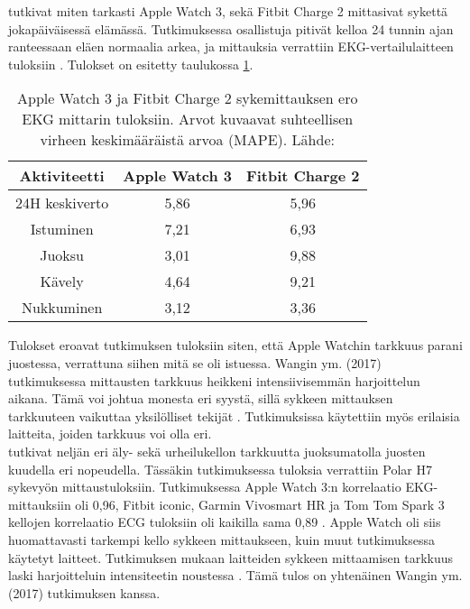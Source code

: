 \documentclass[utf8,bachelor,finnish]{bachelor}
\begin{document}
  \textcite{nelson_accuracy_2019} tutkivat miten tarkasti Apple Watch 3, sekä Fitbit Charge 2 mittasivat sykettä jokapäiväisessä elämässä.
   Tutkimuksessa osallistuja pitivät kelloa 24 tunnin ajan ranteessaan eläen normaalia arkea, ja mittauksia verrattiin
    EKG-vertailulaitteen tuloksiin \parencite{nelson_accuracy_2019}. Tulokset on esitetty taulukossa \ref{table:nelson}.\\
    
    \begin{table}[H]
     \begin{center}
      \begin{tabular}{||c c c||}   
       \hline
       Aktiviteetti & Apple Watch 3 & Fitbit Charge 2\\ [0.5ex] 
       \hline\hline
       24H keskiverto & 5,86 & 5,96\\ 
       \hline
       Istuminen & 7,21 & 6,93\\ 
       \hline
       Juoksu & 3,01 & 9,88 \\
       \hline
       Kävely & 4,64 & 9,21\\
       \hline
       Nukkuminen & 3,12 & 3,36\\[1ex] 
       \hline
      \end{tabular}
    \caption{Apple Watch 3 ja Fitbit Charge 2 sykemittauksen ero EKG mittarin tuloksiin. Arvot kuvaavat suhteellisen virheen keskimääräistä arvoa (MAPE). Lähde: \textcite{nelson_accuracy_2019}}
    \label{table:nelson}
     \end{center} 
    \end{table}

  Tulokset eroavat \textcite{wang_accuracy_2017} tutkimuksen tuloksiin siten, että Apple Watchin tarkkuus parani juostessa, verrattuna siihen mitä se oli istuessa. Wangin ym. (2017) tutkimuksessa
   mittausten tarkkuus heikkeni intensiivisemmän harjoittelun aikana. Tämä voi johtua monesta eri syystä, sillä sykkeen mittauksen tarkkuuteen vaikuttaa yksilölliset tekijät \parencite{koerber_accuracy_2022,pasadyn_accuracy_2019,hochstadt_continuous_2020}.
    Tutkimuksissa käytettiin myös erilaisia laitteita, joiden tarkkuus voi olla eri. \\

  \textcite{pasadyn_accuracy_2019} tutkivat neljän eri äly- sekä urheilukellon tarkkuutta juoksumatolla juosten kuudella eri nopeudella. Tässäkin tutkimuksessa tuloksia verrattiin
   Polar H7 sykevyön mittaustuloksiin. Tutkimuksessa Apple Watch 3:n korrelaatio EKG-mittauksiin oli 0,96, Fitbit iconic, Garmin Vivosmart HR ja Tom Tom Spark 3
    kellojen korrelaatio ECG tuloksiin oli kaikilla sama 0,89 \parencite{pasadyn_accuracy_2019}. Apple Watch oli siis huomattavasti tarkempi kello sykkeen mittaukseen,
     kuin muut tutkimuksessa käytetyt laitteet. Tutkimuksen mukaan laitteiden sykkeen mittaamisen tarkkuus laski
      harjoitteluin intensiteetin noustessa \parencite{pasadyn_accuracy_2019}. Tämä tulos on yhtenäinen Wangin ym. (2017) tutkimuksen kanssa.\\
  
\end{document}
